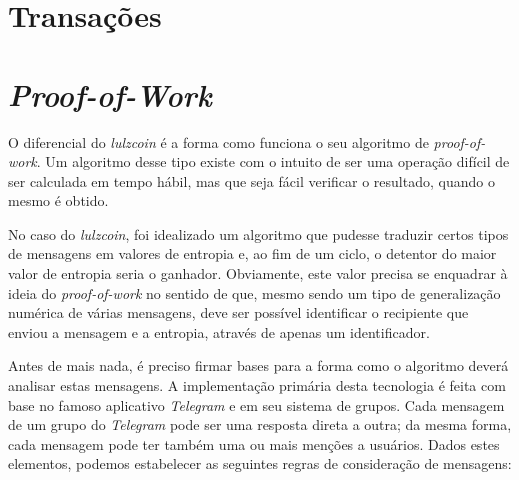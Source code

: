 \documentclass[conference]{IEEEtran}
\begin{document}
\section{Transações}

\section{\textit{Proof-of-Work}}
O diferencial do \textit{lulzcoin} é a forma como funciona o seu algoritmo de \textit{proof-of-work}. Um algoritmo desse tipo existe com o intuito de ser uma operação difícil de ser calculada em tempo hábil, mas que seja fácil verificar o resultado, quando o mesmo é obtido.

No caso do \textit{lulzcoin}, foi idealizado um algoritmo que pudesse traduzir certos tipos de mensagens em valores de entropia e, ao fim de um ciclo, o detentor do maior valor de entropia seria o ganhador. Obviamente, este valor precisa se enquadrar à ideia do \textit{proof-of-work} no sentido de que, mesmo sendo um tipo de generalização numérica de várias mensagens, deve ser possível identificar o recipiente que enviou a mensagem e a entropia, através de apenas um identificador.

Antes de mais nada, é preciso firmar bases para a forma como o algoritmo deverá analisar estas mensagens. A implementação primária desta tecnologia é feita com base no famoso aplicativo \textit{Telegram} e em seu sistema de grupos. Cada mensagem de um grupo do \textit{Telegram} pode ser uma resposta direta a outra; da mesma forma, cada mensagem pode ter também uma ou mais menções a usuários.
Dados estes elementos, podemos estabelecer as seguintes regras de consideração de mensagens:
\end{document}
